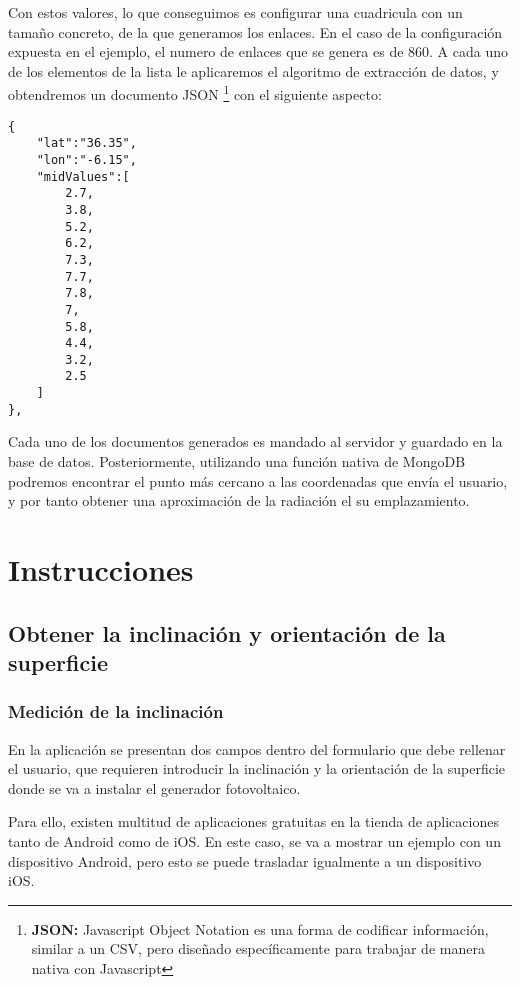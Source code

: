 Con estos valores, lo que conseguimos es configurar una cuadricula con un tamaño concreto, de la que generamos los enlaces. En el caso de la configuración expuesta en el ejemplo, el numero de enlaces que se genera es de 860. A cada uno de los elementos de la lista le aplicaremos el algoritmo de extracción de datos, y obtendremos un documento JSON \footnote{\textbf{JSON:} Javascript Object Notation es una forma de codificar información, similar a un CSV, pero diseñado específicamente para trabajar de manera nativa con Javascript} con el siguiente aspecto:

\begin{lstlisting}[style=ES6, caption={Ejemplo de un documento JSON con la información de un punto concreto \label{code:json_example}}]
{
    "lat":"36.35",
    "lon":"-6.15",
    "midValues":[
        2.7,
        3.8,
        5.2,
        6.2,
        7.3,
        7.7,
        7.8,
        7,
        5.8,
        4.4,
        3.2,
        2.5
    ]
},
\end{lstlisting}

Cada uno de los documentos generados es mandado al servidor y guardado en la base de datos. Posteriormente, utilizando una función nativa de MongoDB podremos encontrar el punto más cercano a las coordenadas que envía el usuario, y por tanto obtener una aproximación de la radiación el su emplazamiento.

\section{Instrucciones}

\subsection{Obtener la inclinación y orientación de la superficie}

\subsubsection{Medición de la inclinación}

En la aplicación se presentan dos campos dentro del formulario que debe rellenar el usuario, que requieren introducir la inclinación y la orientación de la superficie donde se va a instalar el generador fotovoltaico.

Para ello, existen multitud de aplicaciones gratuitas en la tienda de aplicaciones tanto de Android como de iOS. En este caso, se va a mostrar un ejemplo con un dispositivo Android, pero esto se puede trasladar igualmente a un dispositivo iOS.

